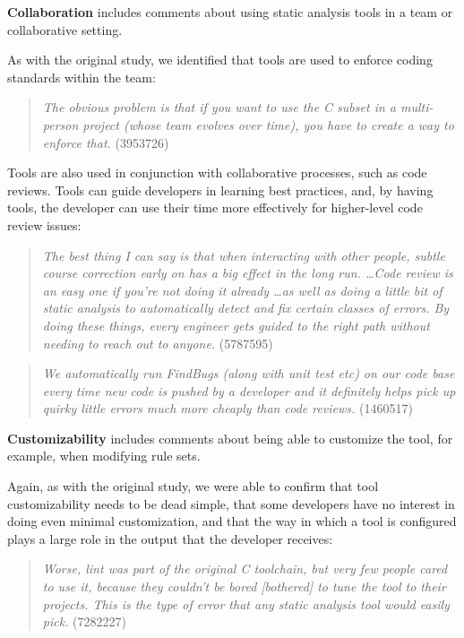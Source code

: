 \documentclass{sig-alternate}
\begin{document}
\textbf{Collaboration} includes comments about using static analysis tools in a team or collaborative setting.

As with the original study, we identified that tools are used to enforce coding standards within the team:

\begin{quote}
\textit{The obvious problem is that if you want to use the C subset in a multi-person project (whose team evolves over time), you have to create a way to enforce that.} (3953726)
\end{quote}

Tools are also used in conjunction with collaborative processes, such as code reviews. Tools can guide developers in learning best practices, and, by having tools, the developer can use their time more effectively for higher-level code review issues:

\begin{quote}
\textit{The best thing I can say is that when interacting with other people, subtle course correction early on has a big effect in the long run. \ldots Code review is an easy one if you're not doing it already \ldots  as well as doing a little bit of static analysis to automatically detect and fix certain classes of errors. By doing these things, every engineer gets guided to the right path without needing to reach out to anyone.} (5787595)
\end{quote}

\begin{quote}
\textit{We automatically run FindBugs (along with unit test etc) on our code base every time new code is pushed by a developer and it definitely helps pick up quirky little errors much more cheaply than code reviews.} (1460517)
\end{quote}

\textbf{Customizability} includes comments about being able to customize the tool, for example, when modifying rule sets.

Again, as with the original study, we were able to confirm that tool customizability needs to be dead simple, that some developers have no interest in doing even minimal customization, and that the way in which a tool is configured plays a large role in the output that the developer receives:

\begin{quote}
\textit{Worse, lint was part of the original C toolchain, but very few people cared to use it, because they couldn't be bored [bothered] to tune the tool to their projects. This is the type of error that any static analysis tool would easily pick.} (7282227)
\end{quote}
\end{document}
